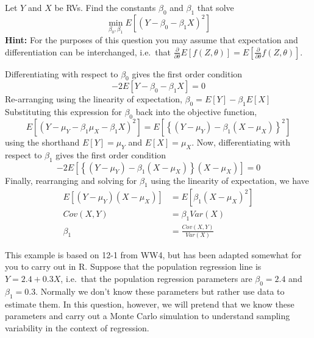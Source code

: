 \documentclass[addpoints,12pt]{exam}\usepackage[]{graphicx}\usepackage[]{color}
\begin{document}
\begin{questions}

\question Let $Y$ and $X$ be RVs. Find the constants $\beta_0$ and $\beta_1$ that solve  
\[
  \min_{\beta_0, \beta_1} E[(Y - \beta_0 - \beta_1 X)^2]
\]
\textbf{Hint:} For the purposes of this question you may assume that expectation and differentiation can be interchanged, i.e.\ that $\frac{\partial}{\partial \theta} E[f(Z,\theta)] = E[\frac{\partial}{\partial \theta} f(Z,\theta)]$.
\begin{solution}
  Differentiating with respect to $\beta_0$ gives the first order condition
  \[
    -2 E[Y - \beta_0 - \beta_1 X] = 0
    \]
  Re-arranging using the linearity of expectation, $\beta_0 = E[Y] - \beta_1 E[X]$
  Substituting this expression for $\beta_0$ back into the objective function, 
  \[
    E[(Y - \mu_Y - \beta_1 \mu_X - \beta_1 X)^2] = E\left[ \left\{ (Y-\mu_Y) - \beta_1 (X - \mu_X)\right\}^2\right]
  \]
  using the shorthand $E[Y] = \mu_Y$ and $E[X] = \mu_X$.
  Now, differentiating with respect to $\beta_1$ gives the first order condition
  \[
    -2 E\left[ \left\{(Y - \mu_Y) - \beta_1(X - \mu_X)\right\} (X - \mu_X)\right] = 0
    \]
 Finally, rearranging and solving for $\beta_1$ using the linearity of expectation, we have
 \begin{align*}
    E[(Y - \mu_Y)(X - \mu_X)] &=  E[\beta_1(X - \mu_X)^2]\\
    Cov(X,Y) &=  \beta_1 Var(X)\\
    \beta_1 &= \frac{Cov(X,Y)}{Var(X)}
 \end{align*}
\end{solution}

	\question This example is based on 12-1 from WW4, but has been adapted somewhat for you to carry out in R. Suppose that the population regression line is $Y = 2.4 + 0.3 X$, i.e.\ that the population regression parameters are $\beta_0 = 2.4$ and $\beta_1 = 0.3$. Normally we don't know these parameters but rather use data to estimate them. In this question, however, we will pretend that we know these parameters and carry out a Monte Carlo simulation to understand sampling variability in the context of regression.
	\begin{parts}

\end{parts}
\end{questions}
\end{document}
